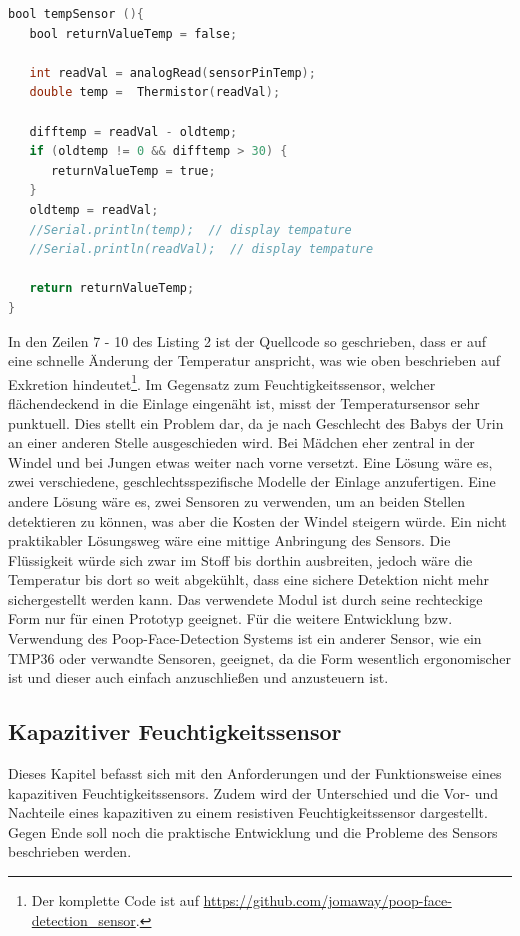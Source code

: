 \begin{lstlisting}[language=C, caption=Trigger für Exkretion durch
Temperaturvergleich.]
bool tempSensor (){
   bool returnValueTemp = false;
    
   int readVal = analogRead(sensorPinTemp);
   double temp =  Thermistor(readVal);
	
   difftemp = readVal - oldtemp;
   if (oldtemp != 0 && difftemp > 30) {
      returnValueTemp = true;
   }
   oldtemp = readVal;
   //Serial.println(temp);  // display tempature
   //Serial.println(readVal);  // display tempature
			  
   return returnValueTemp;
}
\end{lstlisting}

In den Zeilen 7 - 10 des Listing 2 ist der Quellcode so geschrieben, dass er auf eine
schnelle Änderung der Temperatur anspricht, was wie oben beschrieben
auf Exkretion hindeutet\footnote{Der komplette Code ist auf
\url{https://github.com/jomaway/poop-face-detection_sensor}.}.
Im Gegensatz zum Feuchtigkeitssensor, welcher flächendeckend in die
Einlage eingenäht ist, misst der Temperatursensor sehr punktuell. Dies
stellt ein Problem dar, da je nach Geschlecht des Babys der Urin an
einer anderen Stelle ausgeschieden wird. Bei Mädchen eher zentral in der Windel und
bei Jungen etwas weiter nach vorne versetzt. Eine Lösung wäre es, zwei
verschiedene, geschlechtsspezifische Modelle der Einlage anzufertigen.
Eine andere Lösung wäre es, zwei Sensoren zu verwenden, um an beiden
Stellen detektieren zu können, was aber die Kosten der Windel
steigern würde. Ein nicht praktikabler Lösungsweg wäre eine mittige
Anbringung des Sensors. Die Flüssigkeit würde sich zwar im Stoff bis
dorthin ausbreiten, jedoch wäre die Temperatur bis dort so weit
abgekühlt, dass eine sichere Detektion nicht mehr sichergestellt
werden kann.
Das verwendete Modul ist durch seine rechteckige Form nur für einen
Prototyp geeignet. Für die weitere Entwicklung bzw. Verwendung des
Poop-Face-Detection Systems ist ein anderer Sensor, wie ein TMP36
oder verwandte Sensoren, geeignet, da die Form wesentlich ergonomischer
ist und dieser auch einfach anzuschließen und anzusteuern ist.

\subsection{Kapazitiver Feuchtigkeitssensor}
\label{sec:cap_sensor}

Dieses Kapitel befasst sich mit den Anforderungen und der Funktionsweise eines kapazitiven Feuchtigkeitssensors. Zudem wird der Unterschied und die Vor- und Nachteile eines kapazitiven zu einem resistiven Feuchtigkeitssensor dargestellt. Gegen Ende soll noch die praktische Entwicklung und die Probleme des Sensors beschrieben werden.


